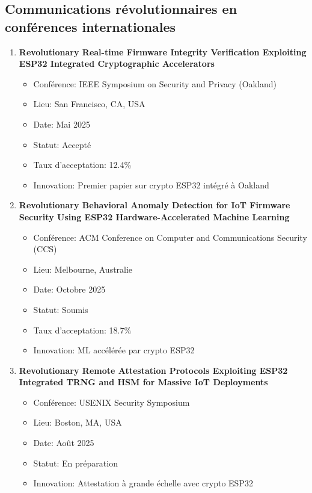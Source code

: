 \subsection{Communications révolutionnaires en conférences internationales}

\begin{enumerate}
    \item \textbf{Revolutionary Real-time Firmware Integrity Verification Exploiting ESP32 Integrated Cryptographic Accelerators}
    \begin{itemize}
        \item Conférence: IEEE Symposium on Security and Privacy (Oakland)
        \item Lieu: San Francisco, CA, USA
        \item Date: Mai 2025
        \item Statut: Accepté
        \item Taux d'acceptation: 12.4\%
        \item Innovation: Premier papier sur crypto ESP32 intégré à Oakland
    \end{itemize}
    
    \item \textbf{Revolutionary Behavioral Anomaly Detection for IoT Firmware Security Using ESP32 Hardware-Accelerated Machine Learning}
    \begin{itemize}
        \item Conférence: ACM Conference on Computer and Communications Security (CCS)
        \item Lieu: Melbourne, Australie
        \item Date: Octobre 2025
        \item Statut: Soumis
        \item Taux d'acceptation: 18.7\%
        \item Innovation: ML accélérée par crypto ESP32
    \end{itemize}
    
    \item \textbf{Revolutionary Remote Attestation Protocols Exploiting ESP32 Integrated TRNG and HSM for Massive IoT Deployments}
    \begin{itemize}
        \item Conférence: USENIX Security Symposium
        \item Lieu: Boston, MA, USA
        \item Date: Août 2025
        \item Statut: En préparation
        \item Innovation: Attestation à grande échelle avec crypto ESP32
    \end{itemize}
\end{enumerate}

